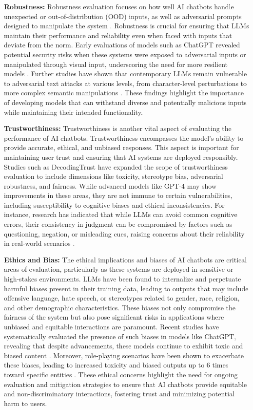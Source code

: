 \textbf{Robustness:} Robustness evaluation focuses on how well AI chatbots handle unexpected or out-of-distribution (OOD) inputs, as well as adversarial prompts designed to manipulate the system \cite{wang2022generalizing}. Robustness is crucial for ensuring that LLMs maintain their performance and reliability even when faced with inputs that deviate from the norm. Early evaluations of models such as ChatGPT revealed potential security risks when these systems were exposed to adversarial inputs or manipulated through visual input, underscoring the need for more resilient models \cite{yang2022glue}. Further studies have shown that contemporary LLMs remain vulnerable to adversarial text attacks at various levels, from character-level perturbations to more complex semantic manipulations \cite{zhu2023promptbench}. These findings highlight the importance of developing models that can withstand diverse and potentially malicious inputs while maintaining their intended functionality.

\textbf{Trustworthiness:} Trustworthiness is another vital aspect of evaluating the performance of AI chatbots. Trustworthiness encompasses the model's ability to provide accurate, ethical, and unbiased responses. This aspect is important for maintaining user trust and ensuring that AI systems are deployed responsibly. Studies such as DecodingTrust have expanded the scope of trustworthiness evaluation to include dimensions like toxicity, stereotype bias, adversarial robustness, and fairness. While advanced models like GPT-4 may show improvements in these areas, they are not immune to certain vulnerabilities, including susceptibility to cognitive biases and ethical inconsistencies. For instance, research has indicated that while LLMs can avoid common cognitive errors, their consistency in judgment can be compromised by factors such as questioning, negation, or misleading cues, raising concerns about their reliability in real-world scenarios \cite{wang2023decodingtrust}.

\textbf{Ethics and Bias:} The ethical implications and biases of AI chatbots are critical areas of evaluation, particularly as these systems are deployed in sensitive or high-stakes environments. LLMs have been found to internalize and perpetuate harmful biases present in their training data, leading to outputs that may include offensive language, hate speech, or stereotypes related to gender, race, religion, and other demographic characteristics. These biases not only compromise the fairness of the system but also pose significant risks in applications where unbiased and equitable interactions are paramount. Recent studies have systematically evaluated the presence of such biases in models like ChatGPT, revealing that despite advancements, these models continue to exhibit toxic and biased content \cite{zhuo2023red}. Moreover, role-playing scenarios have been shown to exacerbate these biases, leading to increased toxicity and biased outputs up to 6 times toward specific entities \cite{deshpande2023toxicity}. These ethical concerns highlight the need for ongoing evaluation and mitigation strategies to ensure that AI chatbots provide equitable and non-discriminatory interactions, fostering trust and minimizing potential harm to users.

